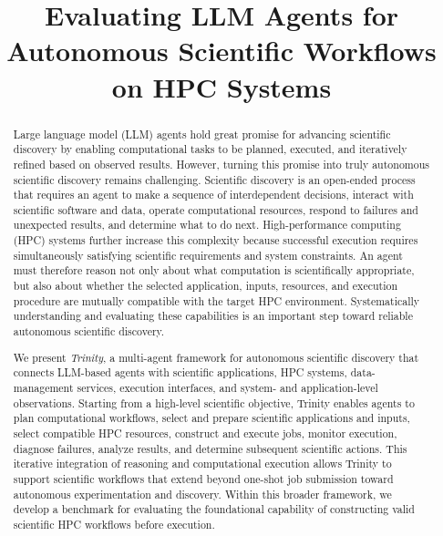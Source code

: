 \documentclass[conference]{IEEEtran}
\title{Evaluating LLM Agents for Autonomous Scientific Workflows on HPC Systems}
\begin{document}
\maketitle



\begin{abstract}
Large language model (LLM) agents hold great promise for advancing scientific discovery by enabling computational tasks to be planned, executed, and iteratively refined based on observed results. However, turning this promise into truly autonomous scientific discovery remains challenging. Scientific discovery is an open-ended process that requires an agent to make a sequence of interdependent decisions, interact with scientific software and data, operate computational resources, respond to failures and unexpected results, and determine what to do next. High-performance computing (HPC) systems further increase this complexity because successful execution requires simultaneously satisfying scientific requirements and system constraints. An agent must therefore reason not only about what computation is scientifically appropriate, but also about whether the selected application, inputs, resources, and execution procedure are mutually compatible with the target HPC environment. Systematically understanding and evaluating these capabilities is an important step toward reliable autonomous scientific discovery.

We present \textit{Trinity}, a multi-agent framework for autonomous scientific discovery that connects LLM-based agents with scientific applications, HPC systems, data-management services, execution interfaces, and system- and application-level observations. Starting from a high-level scientific objective, Trinity enables agents to plan computational workflows, select and prepare scientific applications and inputs, select compatible HPC resources, construct and execute jobs, monitor execution, diagnose failures, analyze results, and determine subsequent scientific actions. This iterative integration of reasoning and computational execution allows Trinity to support scientific workflows that extend beyond one-shot job submission toward autonomous experimentation and discovery. Within this broader framework, we develop a benchmark for evaluating the foundational capability of constructing valid scientific HPC workflows before execution.


\end{abstract}
\end{document}
